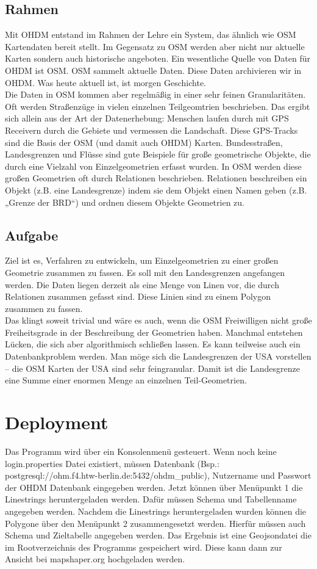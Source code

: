 \documentclass[a4paper, 12pt]{article}
\begin{document}
\subsection{Rahmen}
Mit OHDM entstand im Rahmen der Lehre ein System, das ähnlich wie OSM Kartendaten bereit
stellt. Im Gegensatz zu OSM werden aber nicht nur aktuelle Karten sondern auch historische
angeboten. Ein wesentliche Quelle von Daten für OHDM ist OSM. OSM sammelt aktuelle Daten.
Diese Daten archivieren wir in OHDM. Was heute aktuell ist, ist morgen Geschichte. \\
	\newline
Die Daten in OSM kommen aber regelmäßig in einer sehr feinen Granularitäten. Oft werden
Straßenzüge in vielen einzelnen Teilgeomtrien beschrieben. Das ergibt sich allein aus der Art der
Datenerhebung: Menschen laufen durch mit GPS Receivern durch die Gebiete und vermessen die
Landschaft. Diese GPS-Tracks sind die Basis der OSM (und damit auch OHDM) Karten.
Bundesstraßen, Landesgrenzen und Flüsse sind gute Beispiele für große geometrische Objekte, die
durch eine Vielzahl von Einzelgeometrien erfasst wurden. In OSM werden diese großen Geometrien
oft durch Relationen beschrieben. Relationen beschreiben ein Objekt (z.B. eine Landesgrenze)
indem sie dem Objekt einen Namen geben (z.B. „Grenze der BRD“) und ordnen diesem Objekte Geometrien zu.
	\subsection{Aufgabe}
Ziel ist es, Verfahren zu entwickeln, um Einzelgeometrien zu einer großen Geometrie zusammen zu
fassen. Es soll mit den Landesgrenzen angefangen werden. Die Daten liegen derzeit als eine Menge
von Linen vor, die durch Relationen zusammen gefasst sind. Diese Linien sind zu einem Polygon
zusammen zu fassen.\\
	\newline
Das klingt soweit trivial und wäre es auch, wenn die OSM Freiwilligen nicht große Freiheitsgrade
in der Beschreibung der Geometrien haben. Manchmal entstehen Lücken, die sich aber
algorithmisch schließen lassen. Es kann teilweise auch ein Datenbankproblem werden. Man möge
sich die Landesgrenzen der USA vorstellen – die OSM Karten der USA sind sehr feingranular.
Damit ist die Landesgrenze eine Summe einer enormen Menge an einzelnen Teil-Geometrien\cite{rahmen}.
	\newpage
\section{Deployment}
Das Programm wird über ein Konsolenmenü gesteuert.
Wenn noch keine login.properties Datei existiert, müssen Datenbank (Bsp.: postgresql://ohm.f4.htw-berlin.de:5432/ohdm_public),  Nutzername und Passwort der OHDM Datenbank eingegeben werden.
Jetzt können über Menüpunkt 1 die Linestrings heruntergeladen werden. Dafür müssen Schema und Tabellenname angegeben werden. 
Nachdem die Linestrings heruntergeladen wurden können die Polygone über den Menüpunkt 2 zusammengesetzt werden. Hierfür müssen auch Schema und Zieltabelle angegeben werden.
Das Ergebnis ist eine Geojsondatei die im Rootverzeichnis des Programms gespeichert wird. Diese kann dann zur Ansicht bei mapshaper.org hochgeladen werden.
\end{document}
